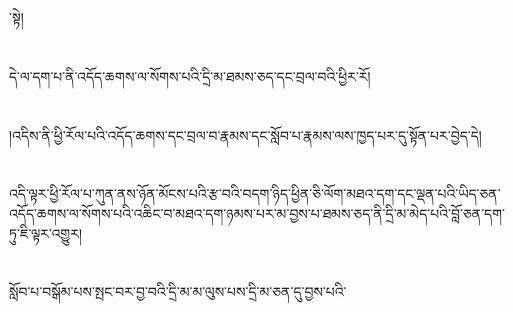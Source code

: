 ་སྟེ།\chapter{ }དེ་ལ་དག་པ་ནི་འདོད་ཆགས་ལ་སོགས་པའི་དྲི་མ་ཐམས་ཅད་དང་བྲལ་བའི་ཕྱིར་རོ།\chapter{ }།འདིས་ནི་ཕྱི་རོལ་པའི་འདོད་ཆགས་དང་བྲལ་བ་རྣམས་དང་སློབ་པ་རྣམས་ལས་ཁྱད་པར་དུ་སྟོན་པར་བྱེད་དེ།\chapter{ }འདི་ལྟར་ཕྱི་རོལ་པ་ཀུན་ནས་ཉོན་མོངས་པའི་རྩ་བའི་བདག་ཉིད་ཕྱིན་ཅི་ལོག་མཐའ་དག་དང་ལྡན་པའི་ཡིད་ཅན་འདོད་ཆགས་ལ་སོགས་པའི་འཆིང་བ་མཐའ་དག་ཉམས་པར་མ་བྱས་པ་ཐམས་ཅད་ནི་དྲི་མ་མེད་པའི་བློ་ཅན་དག་ཏུ་ཇི་ལྟར་འགྱུར།\chapter{ }སློབ་པ་བསྒོམ་པས་སྤང་བར་བྱ་བའི་དྲི་མ་མ་ལུས་པས་དྲི་མ་ཅན་དུ་བྱས་པའི་